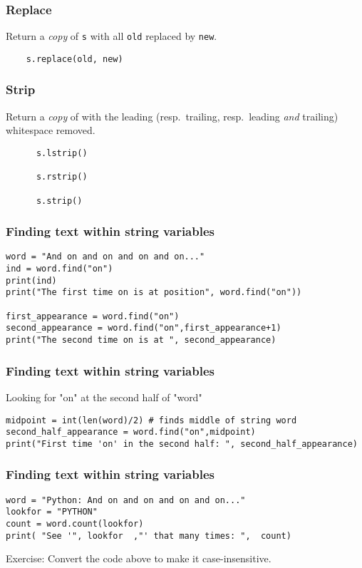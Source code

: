 \begin{frame}[fragile]\frametitle{Replace}
    Return a \emph{copy} of \texttt{s} with all \texttt{old} replaced by \texttt{new}.
  \begin{lstlisting}
  	s.replace(old, new)
  \end{lstlisting}
\end{frame}

\begin{frame}[fragile]\frametitle{Strip}
    Return a \emph{copy} of with the leading (resp.\ trailing, resp.\ leading \emph{and} trailing) whitespace removed.
  \begin{lstlisting}
      s.lstrip()

      s.rstrip()

      s.strip()
  \end{lstlisting}

\end{frame}


\begin{frame}[fragile]\frametitle{Finding text within string variables}
\begin{lstlisting}
word = "And on and on and on and on..." 
ind = word.find("on")
print(ind)
print("The first time on is at position", word.find("on"))

first_appearance = word.find("on")
second_appearance = word.find("on",first_appearance+1)
print("The second time on is at ", second_appearance)
\end{lstlisting}
\end{frame}


\begin{frame}[fragile]\frametitle{Finding text within string variables}
 Looking for "on" at the second half of "word"
\begin{lstlisting}
midpoint = int(len(word)/2) # finds middle of string word
second_half_appearance = word.find("on",midpoint)
print("First time 'on' in the second half: ", second_half_appearance)
\end{lstlisting}

\end{frame}


\begin{frame}[fragile]\frametitle{Finding text within string variables}
\begin{lstlisting}
word = "Python: And on and on and on and on..."
lookfor = "PYTHON"
count = word.count(lookfor)
print( "See '", lookfor  ,"' that many times: ",  count)
\end{lstlisting}
Exercise: Convert the code above to make it case-insensitive.
\end{frame}


